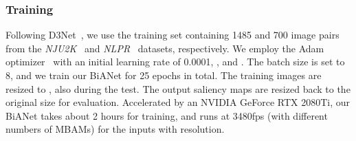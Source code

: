 \documentclass[journal]{IEEEtran}
\newcommand{\DTNet}{D3Net~\cite{fan2019D3Net}}
\begin{document}
\subsubsection{Training}
Following \DTNet, we use the training set containing 1485 and 700 image pairs from the \textit{NJU2K}~\cite{ju2014depth}
and \textit{NLPR}~\cite{peng2014rgbd} datasets, respectively.
We employ the Adam optimizer~\cite{kingma2015adam} with an initial learning rate of 0.0001, , and .
The batch size is set to 8,
and we train our BiANet for 25 epochs in total.
The training images are resized to , also during the test.
The output saliency maps are resized back to the original size for evaluation.
Accelerated by an NVIDIA GeForce RTX 2080Ti, 
our BiANet takes about 2 hours for training, 
and runs at 3480fps (with different numbers of MBAMs) for the inputs with  resolution.
\end{document}
